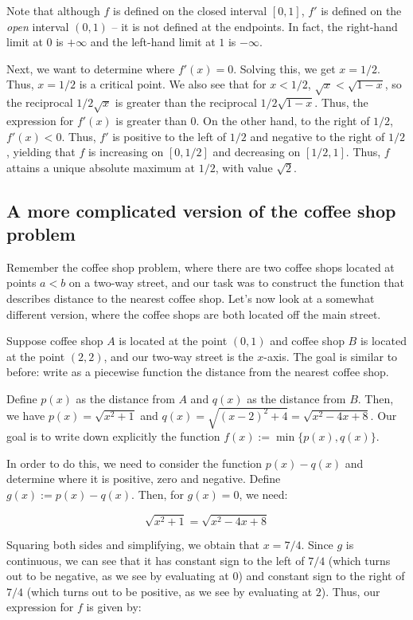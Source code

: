 \documentclass[10pt]{amsart}
\begin{document}
Note that although $f$ is defined on the closed interval $[0,1]$, $f'$
is defined on the {\em open} interval $(0,1)$ -- it is not defined at
the endpoints. In fact, the right-hand limit at $0$ is $+\infty$ and
the left-hand limit at $1$ is $-\infty$.

Next, we want to determine where $f'(x) = 0$. Solving this, we get $x
= 1/2$. Thus, $x = 1/2$ is a critical point. We also see that for $x <
1/2$, $\sqrt{x} < \sqrt{1 - x}$, so the reciprocal $1/2\sqrt{x}$ is
greater than the reciprocal $1/2\sqrt{1 - x}$. Thus, the expression
for $f'(x)$ is greater than $0$. On the other hand, to the right of
$1/2$, $f'(x) < 0$. Thus, $f'$ is positive to the left of $1/2$ and
negative to the right of $1/2$, yielding that $f$ is increasing on
$[0,1/2]$ and decreasing on $[1/2,1]$. Thus, $f$ attains a unique
absolute maximum at $1/2$, with value $\sqrt{2}$.

\subsection*{A more complicated version of the coffee shop problem}

Remember the coffee shop problem, where there are two coffee shops
located at points $a < b$ on a two-way street, and our task was to
construct the function that describes distance to the nearest coffee
shop. Let's now look at a somewhat different version, where the coffee
shops are both located off the main street.

Suppose coffee shop $A$ is located at the point $(0,1)$ and coffee
shop $B$ is located at the point $(2,2)$, and our two-way street is
the $x$-axis. The goal is similar to before: write as a piecewise
function the distance from the nearest coffee shop.

Define $p(x)$ as the distance from $A$ and $q(x)$ as the distance from
$B$. Then, we have $p(x) = \sqrt{x^2 + 1}$ and $q(x) = \sqrt{(x - 2)^2
+ 4} = \sqrt{x^2 - 4x + 8}$. Our goal is to write down explicitly the
function $f(x) := \min \{ p(x), q(x) \}$.

In order to do this, we need to consider the function $p(x) - q(x)$
and determine where it is positive, zero and negative. Define $g(x) :=
p(x) - q(x)$. Then, for $g(x) = 0$, we need:

$$\sqrt{x^2 + 1} = \sqrt{x^2 - 4x + 8}$$

Squaring both sides and simplifying, we obtain that $x = 7/4$. Since
$g$ is continuous, we can see that it has constant sign to the left of
$7/4$ (which turns out to be negative, as we see by evaluating at $0$)
and constant sign to the right of $7/4$ (which turns out to be
positive, as we see by evaluating at $2$). Thus, our expression for
$f$ is given by:
\end{document}
